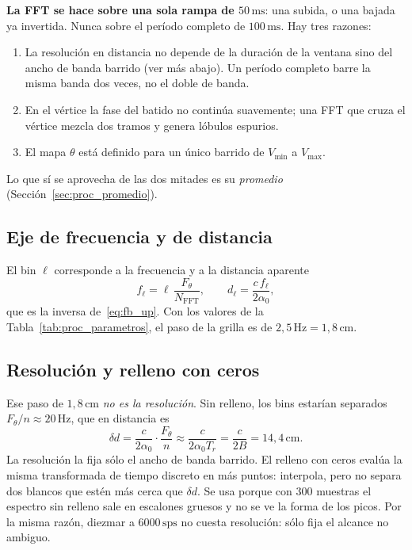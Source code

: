 \textbf{La FFT se hace sobre una sola rampa de $50\,\text{ms}$}: una subida,
o una bajada ya invertida. Nunca sobre el período completo de
$100\,\text{ms}$. Hay tres razones:
\begin{enumerate}
  \item La resolución en distancia no depende de la duración de la ventana
    sino del ancho de banda barrido (ver más abajo). Un período completo
    barre la misma banda dos veces, no el doble de banda.
  \item En el vértice la fase del batido no continúa suavemente; una FFT
    que cruza el vértice mezcla dos tramos y genera lóbulos espurios.
  \item El mapa $\theta$ está definido para un único barrido de
    $V_\text{min}$ a $V_\text{max}$.
\end{enumerate}
Lo que sí se aprovecha de las dos mitades es su \emph{promedio}
(Sección~\ref{sec:proc_promedio}).

\subsection{Eje de frecuencia y de distancia}

El bin $\ell$ corresponde a la frecuencia y a la distancia aparente
\begin{equation}
  f_\ell = \ell\,\frac{F_\theta}{N_\text{FFT}},
  \qquad
  d_\ell = \frac{c\, f_\ell}{2\alpha_0},
  \label{eq:proc_eje}
\end{equation}
que es la inversa de~\eqref{eq:fb_up}. Con los valores de la
Tabla~\ref{tab:proc_parametros}, el paso de la grilla es de
$2{,}5\,\text{Hz} = 1{,}8\,\text{cm}$.

\subsection{Resolución y relleno con ceros}

Ese paso de $1{,}8\,\text{cm}$ \emph{no es la resolución}. Sin relleno, los
bins estarían separados $F_\theta/n \approx 20\,\text{Hz}$, que en distancia
es
\begin{equation}
  \delta d = \frac{c}{2\alpha_0}\cdot\frac{F_\theta}{n}
  \approx \frac{c}{2\alpha_0 T_r} = \frac{c}{2B} = 14{,}4\,\text{cm}.
\end{equation}
La resolución la fija sólo el ancho de banda barrido. El relleno con ceros
evalúa la misma transformada de tiempo discreto en más puntos: interpola,
pero no separa dos blancos que estén más cerca que $\delta d$. Se usa
porque con $300$ muestras el espectro sin relleno sale en escalones gruesos
y no se ve la forma de los picos. Por la misma razón, diezmar a
$6000\,\text{sps}$ no cuesta resolución: sólo fija el alcance no ambiguo.

